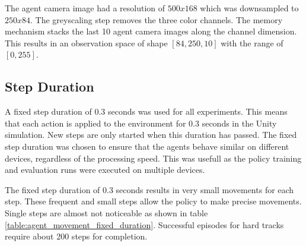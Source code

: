 The agent camera image had a resolution of $500x168$ which was downsampled to $250x84$. The greyscaling step removes the three color channels. The memory mechanism stacks the last 10 agent camera images along the channel dimension. This results in an observation space of shape $[84, 250, 10]$ with the range of $[0, 255]$.

\subsection{Step Duration}
\label{sec:step_duration_experiment}

A fixed step duration of 0.3 seconds was used for all experiments. This means that each action is applied to the environment for 0.3 seconds in the Unity simulation. New steps are only started when this duration has passed. The fixed step duration was chosen to ensure that the agents behave similar on different devices, regardless of the processing speed. This was usefull as the policy training and evaluation runs were executed on multiple devices.

The fixed step duration of 0.3 seconds results in very small movements for each step. These frequent and small steps allow the policy to make precise movements. Single steps are almost not noticeable as shown in table \ref{table:agent_movement_fixed_duration}. Successful episodes for hard tracks require about 200 steps for completion.


